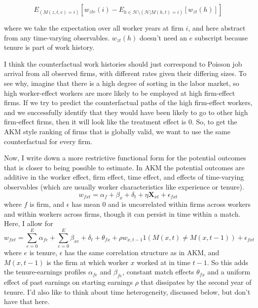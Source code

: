 \documentclass{article}
\begin{document}
$$E_{(M(z,t,e) = i)}[w_{zte}(i) - E_{h \in \mathcal{H} \setminus (\mathcal{H} | M(h,t) = i)}[w_{zt}(h)]]$$

where we take the expectation over all worker years at firm $i$, and here abstract from any time-varying observables. $w_{zt}(h)$ doesn't need an $e$ subscript because tenure is part of work history.

I think the counterfactual work histories should just correspond to Poisson job arrival from all observed firms, with different rates given their differing sizes. To see why, imagine that there is a high degree of sorting in the labor market, so high worker-effect workers are more likely to be employed at high firm-effect firms. If we try to predict the counterfactual paths of the high firm-effect workers, and we successfully identify that they would have been likely to go to other high firm-effect firms, then it will look like the treatment effect is 0. So, to get the AKM style ranking of firms that is globally valid, we want to use the same counterfactual for every firm.

Now, I write down a more restrictive functional form for the potential outcomes that is closer to being possible to estimate. In AKM the potential outcomes are additive in the worker effect, firm effect, time effect, and effects of time-varying observables (which are usually worker characteristics like experience or tenure).%
$$w_{fxt} = \alpha_f + \beta_{x} + \delta_t + \eta \mathbf{X}_{xt} + \epsilon_{fxt}$$
where $f$ is firm, and $\epsilon$ has mean $0$ and is uncorrelated within firms across workers and within workers across firms, though it can persist in time within a match.
Here, I allow for 
$$w_{fxt} = \sum_{e=0}^E \alpha_{fe} + \sum_{e=0}^E \beta_{xe} + \delta_t + \theta_{fx} + \rho w_{x,t-1} 1(M(x,t) \neq M(x,t-1)) + \epsilon_{fxt}$$
where $e$ is tenure, $\epsilon$ has the same correlation structure as in AKM, and $M(x,t-1)$ is the firm at which worker $x$ worked at in time $t-1$. So this adds the tenure-earnings profiles $\alpha_{fe}$ and $\beta_{fe}$, constant match effects $\theta_{fx}$ and a uniform effect of past earnings on starting earnings $\rho$ that dissipates by the second year of tenure. I'd also like to think about time heterogeneity, discussed below, but don't have that here.

\end{document}
